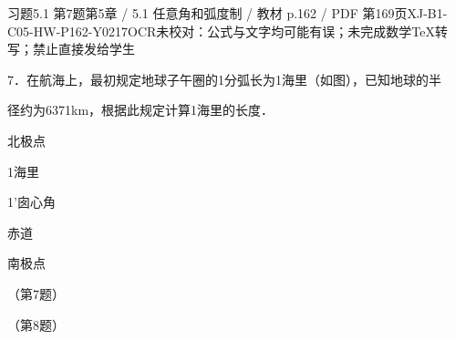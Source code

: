\begin{bankitem}{习题5.1 第7题}{第5章 / 5.1 任意角和弧度制 / 教材 p.162 / PDF 第169页}{XJ-B1-C05-HW-P162-Y0217}{OCR未校对：公式与文字均可能有误；未完成数学TeX转写；禁止直接发给学生}
\begin{ocrdraft}
\par
7．在航海上，最初规定地球子午圈的1分弧长为1海里（如图），已知地球的半
\par
径约为6371km，根据此规定计算1海里的长度．
\par
北极点
\par
1海里
\par
1'囱心角
\par
赤道
\par
南极点
\par
（第7题）
\par
（第8题）
\end{ocrdraft}
\end{bankitem}
